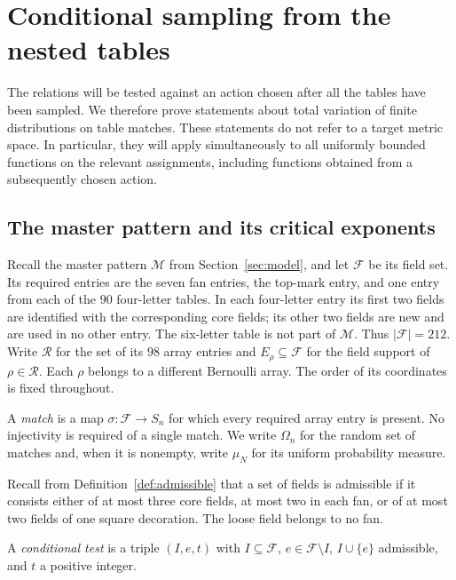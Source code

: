 \section{Conditional sampling from the nested tables}\label{sec:sampling}

The relations will be tested against an action chosen after all the tables
have been sampled.  We therefore prove statements about total variation of
finite distributions on table matches.  These statements do not refer to a
target metric space.  In particular, they will apply simultaneously to all
uniformly bounded functions on the relevant assignments, including functions obtained
from a subsequently chosen action.

\subsection{The master pattern and its critical exponents}

Recall the master pattern $\mathcal M$ from Section~\ref{sec:model},
and let $\mathcal F$ be its field set.  Its required entries are the
seven fan entries, the top-mark entry, and one entry from each of the
$90$ four-letter tables.  In each four-letter entry its first two fields are
identified with the corresponding core fields; its other two fields are
new and are used in no other entry.  The six-letter table is not part of
$\mathcal M$.  Thus $|\mathcal F|=212$.  Write $\mathcal R$ for the set of
its $98$ array entries and $E_\rho\subseteq\mathcal F$ for the field
support of $\rho\in\mathcal R$.  Each $\rho$ belongs to a different
Bernoulli array.  The order of its coordinates is fixed throughout.

A \emph{match} is a map $\sigma:\mathcal F\to S_n$ for which every
required array entry is present.  No injectivity is required of a single
match.  We write $\Omega_n$ for the random set of matches and, when it is
nonempty, write $\mu_N$ for its uniform probability measure.

Recall from Definition~\ref{def:admissible} that a set of fields is
admissible if it consists either of at most three core fields, at most
two in each fan, or of at most two fields of one square decoration.
The loose field belongs to no fan.
\begin{definition}\label{sample:def-test}
A \emph{conditional test} is a triple $(I,e,t)$ with
$I\subseteq\mathcal F$, $e\in\mathcal F\setminus I$,
$I\cup\{e\}$ admissible, and $t$ a positive integer.
\end{definition}

